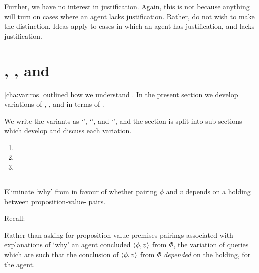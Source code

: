 \begin{note}
  Further, we have no interest in justification.
  Again, this is not because anything will turn on cases where an agent lacks justification.
  Rather, do not wish to make the distinction.
  Ideas apply to cases in which an agent has justification, and lacks justification.
\end{note}

\section{\qWhyV{}, \qHowV{}, and \issueConstraint{}}
\label{cha:var:sec:vars}

\begin{note}
  \autoref{cha:var:ros} outlined how we understand .
  In the present section we develop variations of \qWhy{}, \qHow{}, and \issueInclusion{} in terms of \ros{}.

  We write the variants as `\qWhyV{}', `\qHowV{}', and `\issueConstraint{}', and the section is split into sub-sections which develop and discuss each variation.

  \begin{enumerate}[label=]
  \item
  \item
  \item
  \end{enumerate}

\end{note}

\subsection{\qWhyV{}}
\label{cha:var:sec:vars:qwhyvnp}

\begin{note}
  Eliminate `why' from \qWhy{} in favour of whether pairing \(\phi\) and \(v\) depends on a \ros{} holding between proposition-value-\poP{} pairs.

  Recall:
  \begin{quote}%
    \vspace{-1.5\baselineskip}%
    \questionWhyBasic*
  \end{quote}

  Rather than asking for proposition-value-premises pairings associated with explanations of `why' an agent concluded \(\langle \phi, v \rangle\) from \(\Phi\), the variation of \qWhy{} queries which  are such that the conclusion of \(\langle \phi, v \rangle\) from \(\Phi\) \emph{depended} on the  holding, for the agent.
  \end{note}

